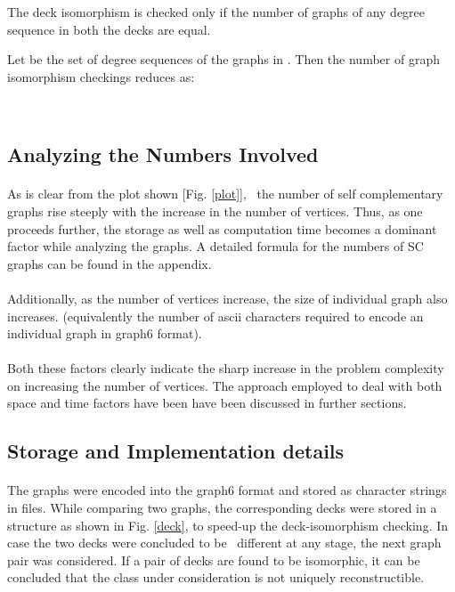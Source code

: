 \documentclass[12pt,conference]{IEEEtran}
\begin{document}
The deck isomorphism is checked only if the number of graphs of any degree sequence in both the decks are equal. 

Let  be the set of degree sequences of the graphs in . Then the number of graph isomorphism checkings reduces as:

\ \ \ \ \ \ \ \   \\



\subsection{\label{2.4} Analyzing the Numbers Involved }
\paragraph*{} As is clear from the plot shown [Fig. \ref{plot}],  the number of self complementary graphs rise steeply with the increase in the number of vertices. Thus, as one proceeds further, the storage as well as computation time becomes a dominant factor while analyzing the graphs. A detailed formula for the numbers of SC graphs can be found in the appendix. 
\paragraph*{} Additionally, as the number of vertices increase, the size of individual graph also increases. (equivalently the number of ascii characters required to encode an individual graph in graph6\cite{b3} format). 
\paragraph*{} Both these factors clearly indicate the sharp increase in the problem complexity on increasing the number of vertices. The approach employed to deal with both space and time factors have been have been discussed in further sections. 


\subsection{\label{2.5} Storage and Implementation details }
\paragraph*{} The graphs were encoded into the graph6 format and stored as character strings in files. While comparing two graphs, the corresponding decks were stored in a structure as shown in Fig. \ref{deck}, to speed-up the deck-isomorphism checking. In case the two decks were concluded to be  different at any stage, the next graph pair was considered. If a pair of decks are found to be isomorphic, it can be concluded that the class under consideration is not uniquely reconstructible.
\end{document}
